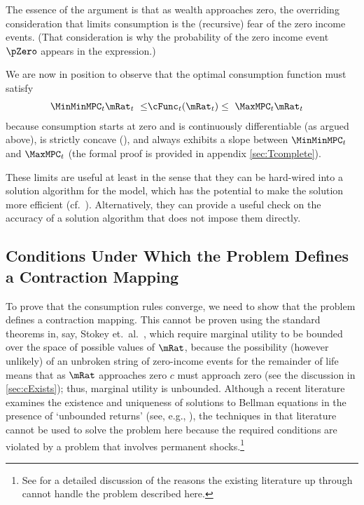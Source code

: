 \documentclass[./BufferStockTheory.tex]{subfiles}
\begin{document}
The essence of the argument is that as wealth approaches zero, the overriding
consideration that limits consumption is the (recursive) fear of the zero
income events.  (That consideration is why the probability of the zero
income event $\pZero$ appears in the expression.)  

We are now in position to observe that the optimal consumption function must satisfy
\begin{equation}\begin{gathered}\begin{aligned}
  \MinMinMPC_{t} \mRat_{t} ~ \leq &   \cFunc_{t}(\mRat_{t})  \leq  ~ \MaxMPC_{t} \mRat_{t} \label{eq:cBounds}
\end{aligned}\end{gathered}\end{equation}
because consumption starts at zero and is continuously
differentiable (as argued above), is strictly
concave (\cite{ckConcavity}), and always exhibits a
slope between $\MinMinMPC_{t}$ and $\MaxMPC_{t}$ (the formal proof is provided in appendix \ref{sec:Tcomplete}).

These limits are useful at least in the sense that they can be hard-wired into a solution algorithm for the model, which has the potential to make the solution more efficient (cf.\ \cite{cctwMoM}).  Alternatively, they can provide a useful check on the accuracy of a solution algorithm that does not impose them directly.

\begin{comment}
If the \FHWC~does not hold, we make do with a less useful bound on the minimal MPC: It is
weakly greater than zero, which follows from the logic in
\ref{sec:cExists}; hence the `max' in \eqref{eq:MinMinMPCDef}.
\end{comment}

\hypertarget{Conditions-Under-Which-the-Problem-Defines-a-Contraction-Mapping}{}
\subsection{Conditions Under Which the Problem Defines a Contraction Mapping}

\label{subsec:contraction}

To prove that the consumption rules converge, we need to show that the
problem defines a contraction mapping. This cannot be proven using the
standard theorems in, say, Stokey et.\ al.~\citeyearpar{slpMethods},
which require marginal utility to be bounded over the space of
possible values of $\mRat$, because the possibility (however unlikely)
of an unbroken string of zero-income events for the remainder of life
means that as $\mRat$ approaches zero $c$ must approach zero (see the
discussion in \ref{sec:cExists}); thus, marginal utility is unbounded.
Although a recent literature examines the existence and uniqueness 
of solutions to Bellman equations in the presence of `unbounded returns' (see, e.g.,
\cite{mnUnique}), the techniques in that literature
cannot be used to solve the problem here because the required conditions 
are violated by a problem that involves permanent shocks.\footnote{See \cite{yaoNote}
for a detailed discussion of the reasons the existing literature up through \cite{mnUnique} cannot handle 
the problem described here.}
\end{document}
